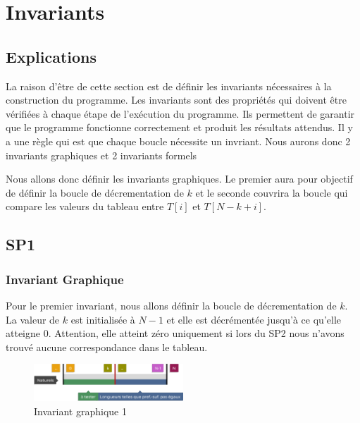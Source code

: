 \section{Invariants}\label{invariants}
\subsection{Explications}
La raison d'être de cette section est de définir les invariants nécessaires à la
construction du programme. Les invariants sont des propriétés qui doivent être
vérifiées à chaque étape de l'exécution du programme. Ils permettent de garantir
que le programme fonctionne correctement et produit les résultats attendus. Il y
a une règle qui est que chaque boucle nécessite un invriant. Nous aurons donc 2
invariants graphiques et 2 invariants formels

Nous allons donc définir les invariants graphiques. Le premier aura pour objectif
de définir la boucle de décrementation de $k$ et le seconde couvrira la boucle
qui compare les valeurs du tableau entre $T[i]$ et $T[N-k+i]$.

\subsection{SP1}
\subsubsection{Invariant Graphique}
Pour le premier invariant, nous allons définir la boucle de décrementation de $k
$. La valeur de $k$ est initialisée à $N - 1$ et elle est décrémentée jusqu'à ce
qu'elle atteigne 0. Attention, elle atteint zéro uniquement si lors du SP2 nous 
n'avons trouvé aucune correspondance dans le tableau.
\begin{figure}[h]
   \centering
   \includegraphics[width=0.5\textwidth]{sp1.pdf}
   \caption{Invariant graphique 1}
   \label{fig:invariant1}
\end{figure}

